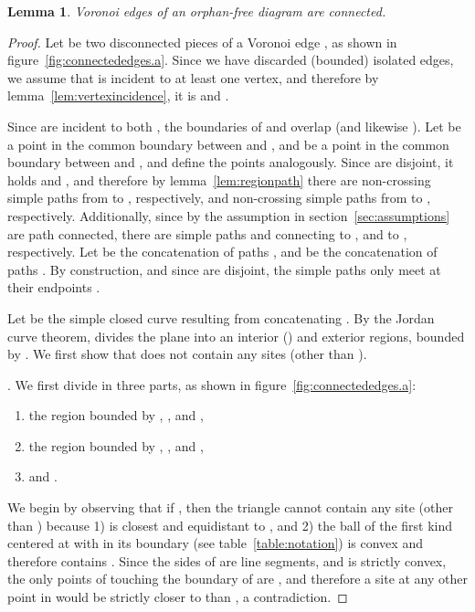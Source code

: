 \documentclass[11pt]{article}
\newtheorem{lemma}{Lemma}
\begin{document}
\begin{lemma}\label{lem:connectededges}
	Voronoi edges of an orphan-free diagram are connected. 
\end{lemma}
\begin{proof}



Let  be two disconnected pieces of a Voronoi edge ,
	as shown in figure~\ref{fig:connectededges.a}.
Since we have discarded (bounded) isolated edges, we assume that  
	 is incident to at least one vertex, and therefore
	by lemma~\ref{lem:vertexincidence},
	 it is  and . 



Since  are incident to both , 
	the boundaries of  and  overlap
	(and likewise ). 
Let  
	be a point in the common boundary between  and , 
	and  be a point in the common boundary between  and , 
	and define the points  analogously.
Since  are disjoint, 
	it holds  and , 
	and therefore by lemma~\ref{lem:regionpath}
		 there are non-crossing simple paths  
		 	from  to , respectively, 	
		 and non-crossing simple paths  
		 	from  to , respectively. 
Additionally, since by the assumption in section~\ref{sec:assumptions}  are path connected, 
	there are simple paths  and 
	connecting  to , and  to , respectively. 
Let  be the concatenation of paths , 
	and  be the concatenation of paths . 
By construction, and since  are disjoint, 
	the simple paths  only meet at their endpoints . 



Let  be the simple closed curve resulting from concatenating . 
By the Jordan curve theorem,  divides the plane into an interior () and exterior regions, bounded by . 
We first show that  does not contain any sites (other than ). 


\vspace*{0.1in}.
We first divide  in three parts, as shown in figure~\ref{fig:connectededges.a}: 
\begin{enumerate}
	\item the region  bounded by , , and ,
	\item the region  bounded by , , and , 
	\item and .
\end{enumerate}
We begin by observing that if , then the triangle  
	cannot contain any site (other than )
	because 1)  is closest and equidistant to ,
	and 2) the ball of the first kind  
	centered at  with  in its boundary (see table~\ref{table:notation}) 
	is convex and therefore contains . 
Since the sides of  are line segments, and  is strictly convex, 
	the only points of  touching the boundary of 
	are , and therefore a site at any other point in  would be strictly closer to  than , 
	a contradiction. 




\end{proof}
\end{document}
